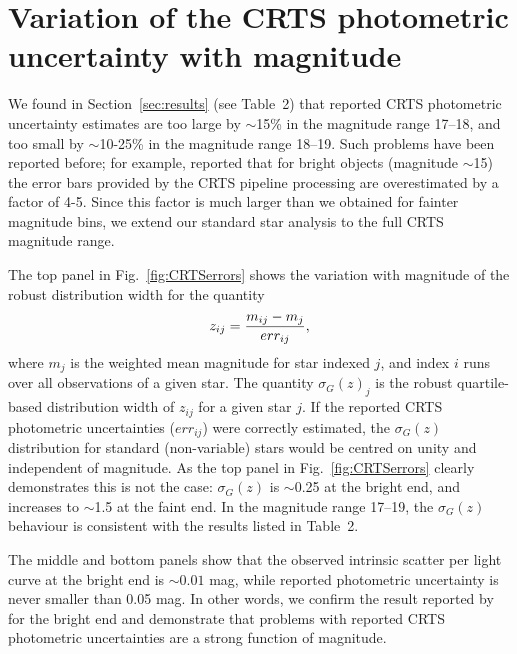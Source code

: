 \documentclass[fleqn,usenatbib]{mnras}
\begin{document}

 


\appendix
\section{Variation of the CRTS photometric uncertainty with magnitude} 
\label{sec:crts_photometry}

We found in Section~\ref{sec:results} (see Table~2) that reported CRTS photometric uncertainty estimates 
are too large by $\sim$15\% in the magnitude range 17--18, and too small by $\sim$10-25\% in the 
magnitude range 18--19. Such problems have been reported before; for example, \cite{vaughan2016}
reported that for bright objects (magnitude $\sim$15) the error bars provided by the CRTS pipeline 
processing are overestimated by a factor of 4-5. Since this factor is much larger than we obtained
for fainter magnitude bins, we extend our standard star analysis to the full CRTS magnitude range. 

The top panel in Fig.~\ref{fig:CRTSerrors} shows the variation with magnitude of the robust distribution 
width for the quantity 
\begin{equation} 
\label{eq:z} 
           z_{ij} = { m_{ij} - m_j \over err_{ij} },
\end{equation}
where  $m_{j}$ is the weighted mean magnitude for star indexed $j$, and index $i$ runs over all
observations of a given star. The quantity $\sigma_G(z)_j$ is the robust quartile-based distribution 
width of $z_{ij}$ for a given star $j$. If the reported CRTS photometric uncertainties ($err_{ij}$) were 
correctly estimated, the $\sigma_G(z)$ distribution for standard (non-variable) stars would be 
centred on unity and independent of magnitude. As the  top panel in Fig.~\ref{fig:CRTSerrors} 
clearly demonstrates this is not the case: $\sigma_G(z)$ is $\sim$0.25 at the bright end, and 
increases to $\sim$1.5 at the faint end. In the magnitude range 17--19, the $\sigma_G(z)$ 
behaviour is consistent with the results listed in Table~2. 

The middle and bottom panels show that the observed intrinsic scatter per light curve at the bright
end is $\sim0.01$ mag, while reported photometric uncertainty is never smaller than 0.05 mag. 
In other words, we confirm the result reported by \cite{vaughan2016} for the bright end and
demonstrate that problems with reported CRTS photometric uncertainties are a strong function
of magnitude. 
\end{document}
